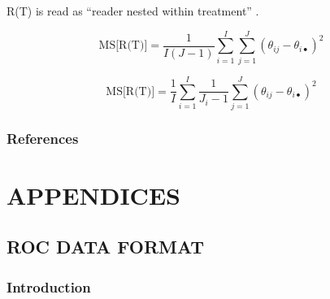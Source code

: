 \documentclass[
]{book}
\begin{document}
R(T) is read as ``reader nested within treatment'' \citep{RN2508}.

\begin{equation}
\text{MS[R(T)]}=\frac{1}{I(J-1)}\sum_{i=1}^{I}\sum_{j=1}^{J}\left ( \theta_{ij} - \theta_{i\bullet} \right )^{2}
\label{eq:MSR-T-Hillis}
\end{equation}

\begin{equation}
\text{MS[R(T)]}=\frac{1}{I}\sum_{i=1}^{I}\frac{1}{J_i-1}\sum_{j=1}^{J}\left ( \theta_{ij} - \theta_{i\bullet} \right )^{2}
\label{eq:MSR-T-Hillis-Modified}
\end{equation}

\hypertarget{SplitPlotChapter-references}{%
\section{References}\label{SplitPlotChapter-references}}

\hypertarget{part-appendices}{%
\part*{APPENDICES}\label{part-appendices}}

\hypertarget{appendix-appendix}{%
\appendix}


\hypertarget{rocdataformat}{%
\chapter{ROC DATA FORMAT}\label{rocdataformat}}

\hypertarget{rocdataformatIntro}{%
\section{Introduction}\label{rocdataformatIntro}}
\end{document}
